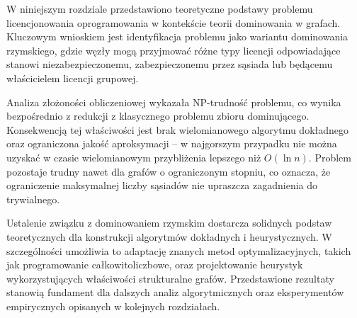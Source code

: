 W niniejszym rozdziale przedstawiono teoretyczne podstawy problemu licencjonowania oprogramowania w kontekście teorii dominowania w grafach. Kluczowym wnioskiem jest identyfikacja problemu jako wariantu dominowania rzymskiego, gdzie węzły mogą przyjmować różne typy licencji odpowiadające stanowi niezabezpieczonemu, zabezpieczonemu przez sąsiada lub będącemu właścicielem licencji grupowej.

Analiza złożoności obliczeniowej wykazała NP-trudność problemu, co wynika bezpośrednio z redukcji z klasycznego problemu zbioru dominującego. Konsekwencją tej właściwości jest brak wielomianowego algorytmu dokładnego oraz ograniczona jakość aproksymacji -- w najgorszym przypadku nie można uzyskać w czasie wielomianowym przybliżenia lepszego niż $O(\ln n)$. Problem pozostaje trudny nawet dla grafów o ograniczonym stopniu, co oznacza, że ograniczenie maksymalnej liczby sąsiadów nie upraszcza zagadnienia do trywialnego.

Ustalenie związku z dominowaniem rzymskim dostarcza solidnych podstaw teoretycznych dla konstrukcji algorytmów dokładnych i heurystycznych. W szczególności umożliwia to adaptację znanych metod optymalizacyjnych, takich jak programowanie całkowitoliczbowe, oraz projektowanie heurystyk wykorzystujących właściwości strukturalne grafów. Przedstawione rezultaty stanowią fundament dla dalszych analiz algorytmicznych oraz eksperymentów empirycznych opisanych w kolejnych rozdziałach.
